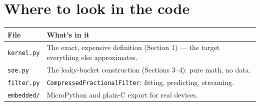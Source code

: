 \documentclass[11pt]{article}
\begin{document}
\section{Where to look in the code}
\begin{table}[h]
\centering
\small
\begin{tabularx}{\textwidth}{lX}
\toprule
File & What's in it \\
\midrule
\texttt{kernel.py} & The exact, expensive definition (Section 1) --- the target everything else approximates. \\
\texttt{soe.py} & The leaky-bucket construction (Sections 3--4): pure math, no data. \\
\texttt{filter.py} & \texttt{CompressedFractionalFilter}: fitting, predicting, streaming. \\
\texttt{embedded/} & MicroPython and plain-C export for real devices. \\
\bottomrule
\end{tabularx}
\end{table}
\end{document}
